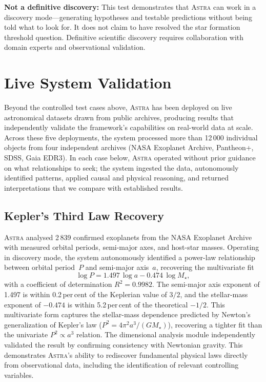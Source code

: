 \documentclass[usenatbib]{rasti}
\newcommand{\astra}{\textsc{Astra}\xspace}
\begin{document}
\textbf{Not a definitive discovery:}
This test demonstrates that \astra can work in a discovery mode---generating hypotheses and testable predictions without being told what to look for.
It does not claim to have resolved the star formation threshold question.
Definitive scientific discovery requires collaboration with domain experts and observational validation.

\section{Live System Validation}
\label{sec:live}

Beyond the controlled test cases above, \astra has been deployed on live astronomical datasets drawn from public archives, producing results that independently validate the framework's capabilities on real-world data at scale.
Across these five deployments, the system processed more than 12\,000 individual objects from four independent archives (NASA Exoplanet Archive, Pantheon+, SDSS, Gaia EDR3).
In each case below, \astra operated without prior guidance on what relationships to seek; the system ingested the data, autonomously identified patterns, applied causal and physical reasoning, and returned interpretations that we compare with established results.

\subsection{Kepler's Third Law Recovery}
\label{sec:live:kepler}

\astra analysed 2\,839 confirmed exoplanets from the NASA Exoplanet Archive with measured orbital periods, semi-major axes, and host-star masses.
Operating in discovery mode, the system autonomously identified a power-law relationship between orbital period~$P$ and semi-major axis~$a$, recovering the multivariate fit
\begin{equation}
  \log P = 1.497\,\log a - 0.474\,\log M_{\star},
  \label{eq:kepler}
\end{equation}
with a coefficient of determination $R^{2} = 0.9982$.
The semi-major axis exponent of 1.497 is within 0.2\,per\,cent of the Keplerian value of $3/2$, and the stellar-mass exponent of $-0.474$ is within 5.2\,per\,cent of the theoretical $-1/2$.
This multivariate form captures the stellar-mass dependence predicted by Newton's generalization of Kepler's law ($P^{2} = 4\pi^{2} a^{3}/(GM_{\star})$), recovering a tighter fit than the univariate $P^{2} \propto a^{3}$ relation.
The dimensional analysis module independently validated the result by confirming consistency with Newtonian gravity.
This demonstrates \astra's ability to rediscover fundamental physical laws directly from observational data, including the identification of relevant controlling variables.
\end{document}
